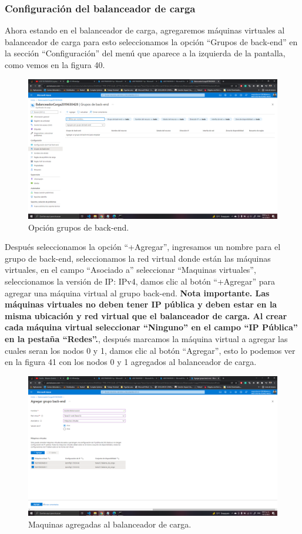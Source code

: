 \documentclass[11pt]{article}
\begin{document}
			\subsubsection{Configuración del balanceador de carga}
			Ahora estando en el balanceador de carga, agregaremos máquinas virtuales al balanceador de carga para esto seleccionamos la opción ``Grupos de back-end'' en la sección ``Configuración'' del menú que aparece a la izquierda de la pantalla, como vemos en la figura 40. 
			\begin{figure}[H]
				\centering
				\includegraphics[scale=0.34]{resources/configBalanceador1-3.png}
				\caption{Opción grupos de back-end.}\label{fig:picture}
			\end{figure}
			Después seleccionamos la opción ``+Agregar'', ingresamos un nombre para el grupo de back-end, seleccionamos la red virtual donde están las máquinas virtuales, en el campo ``Asociado a'' seleccionar ``Maquinas virtuales'', seleccionamos la versión de IP: IPv4, damos clic al botón ``+Agregar'' para agregar una máquina virtual al grupo back-end. \textbf{Nota importante. Las máquinas virtuales no deben tener IP pública y deben estar en la misma ubicación y red virtual que el balanceador de carga. Al crear cada máquina virtual seleccionar ``Ninguno'' en el campo ``IP Pública'' en la pestaña ``Redes''.}, después marcamos la máquina virtual a agregar las cuales seran los nodos 0 y 1, damos clic al botón ``Agregar'', esto lo podemos ver en la figura 41 con los nodos 0 y 1 agregados al balanceador de carga.
			\begin{figure}[H]
				\centering
				\includegraphics[scale=0.34]{resources/configBalanceador4-12.png}
				\caption{Maquinas agregadas al balanceador de carga.}\label{fig:picture}
			\end{figure}
\end{document}

